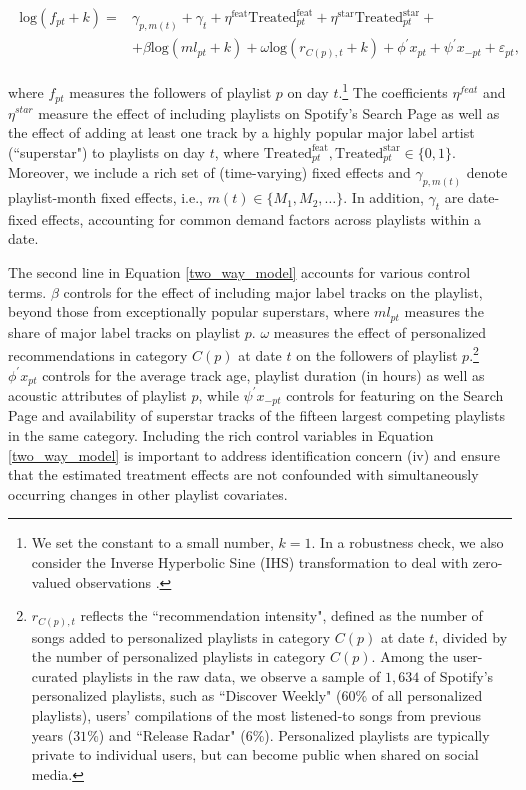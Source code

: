 \documentclass[12pt, a4paper, leqno]{article}
\begin{document}
\begin{align} 
\begin{split} 
\text{log}(f_{pt}+k) =
& \gamma_{p,m(t)} + \gamma_t + \eta^{\text{feat}} \text{Treated}_{pt}^{\text{feat}} + \eta^{\text{star}} \text{Treated}_{pt}^{\text{star}} + \\ & + \beta \text{log}(ml_{pt}+k) + \omega \text{log}(r_{C(p),t}+k) + \phi^{\prime} x_{pt} + \psi^{\prime} x_{-pt} + \varepsilon_{pt}, 
\end{split}
\label{two_way_model}
\end{align} 

where $f_{pt}$ measures the followers of playlist $p$ on day $t$.\footnote{We set the constant to a small number, $k=1$. In a robustness check, we also consider the Inverse Hyperbolic Sine (IHS) transformation to deal with zero-valued observations \citep{ihs}.} The coefficients $\eta^{feat}$ and $\eta^{star}$ measure the effect of including playlists on Spotify's Search Page as well as the effect of adding at least one track by a highly popular major label artist (``superstar") to playlists on day $t$, where $\text{Treated}_{pt}^{\text{feat}}, \text{Treated}_{pt}^{\text{star}} \in \{0,1\}$. 
Moreover, we include a rich set of (time-varying) fixed effects and $\gamma_{p,m(t)}$ denote playlist-month fixed effects, i.e., $m(t) \in \{M_1, M_2, \dots \}$. In addition, $\gamma_t$ are date-fixed effects, accounting for common demand factors across playlists within a date. 

The second line in Equation \ref{two_way_model} accounts for various control terms. $\beta$ controls for the effect of including major label tracks on the playlist, beyond those from exceptionally popular superstars, where $ml_{pt}$ measures the share of major label tracks on playlist $p$. $\omega$ measures the effect of personalized recommendations in category $C(p)$ at date $t$ on the followers of playlist $p$.\footnote{$r_{C(p),t}$ reflects the ``recommendation intensity", defined as the number of songs added to personalized playlists in category $C(p)$ at date $t$, divided by the number of personalized playlists in category $C(p)$.
Among the user-curated playlists in the raw data, we observe a sample of $1,634$ of Spotify's personalized playlists, such as ``Discover Weekly" (60\% of all personalized playlists), users' compilations of the most listened-to songs from previous years ($31\%$) and ``Release Radar" ($6\%$). Personalized playlists are typically private to individual users, but can become public when shared on social media.}
 $\phi^{\prime} x_{pt}$ controls for the average track age, playlist duration (in hours) as well as acoustic
attributes of playlist $p$, while $\psi^{\prime} x_{-pt}$ controls for featuring on the Search Page and availability of superstar tracks of the fifteen largest competing playlists in the same category. 
Including the rich control variables in Equation \ref{two_way_model} is important to address identification concern (iv) and ensure that the estimated treatment effects are not confounded with simultaneously occurring changes in other playlist covariates.
\end{document}
